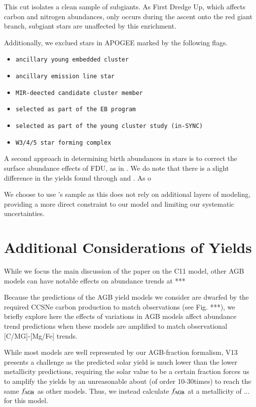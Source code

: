 \documentclass[12pt,oneside]{report}
\begin{document}
This cut isolates a clean sample of subgiants. As First Dredge Up, which affects carbon and nitrogen abundances, only occurs during the ascent onto the red giant branch, subgiant stars are unaffected by this enrichment. 

Additionally, we exclued stars in APOGEE marked by the following flags.
\begin{itemize}
\item \texttt{ancillary young embedded cluster}
\item \texttt{ancillary emission line star}
\item \texttt{MIR-deected candidate cluster member}
\item \texttt{selected as part of the EB program}
\item \texttt{selected as part of the young cluster study (in-SYNC)}
\item \texttt{W3/4/5 star forming complex}
\end{itemize}

A second approach in determining birth abundances in stars is to correct the surface abundance effects of FDU, as in \cite{fiorenzo+21}. We do note that there is a slight difference in the yields found through \cite{fiorenzo+21} and \cite{jack_subgiant}. As o

We choose to use \cite{jack_subgiant}'s sample as this does not rely on additional layers of modeling, providing a more direct constraint to our model and limiting our systematic uncertainties.

\newpage
\section{Additional Considerations of Yields}\label{sec:alt_agb}


While we focus the main discussion of the paper on the C11 model, other AGB models can have notable effects on abundance trends at ***

Because the predictions of the AGB yield models we consider are dwarfed by the
required CCSNe carbon production to match observations (see Fig. ***), we briefly explore here the effects of variations in AGB models affect abundance trend predictions when these models are amplified to match observational [C/MG]-[Mg/Fe] trends. 

While most models are well represented by our AGB-fraction formalism, V13 presents a challenge as the predicted solar yield is much lower than the lower metallicity predictions, requiring the solar value to be a certain fraction forces us to amplify the yields by an unreasonable about (of order 10-30times) to reach the same $f_{\rm AGB}$ as other models. Thus, we instead calculate $f_{\rm AGB}$ at a metallicity of ... for this model. 
\end{document}
